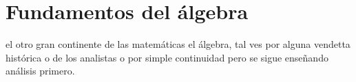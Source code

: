 \chapter{Fundamentos del álgebra} %
\label{cha:fundamentos_del_algebra}

\noindent {} el otro gran continente
de las matemáticas el álgebra, tal ves por alguna vendetta histórica o de los
analistas o por simple continuidad pero se sigue enseñando análisis primero.




